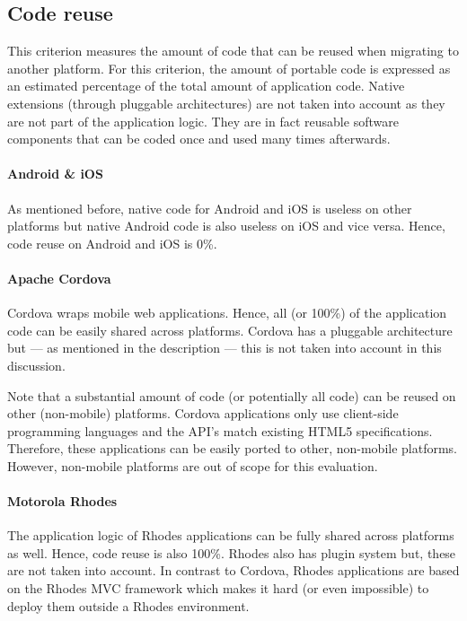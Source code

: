 \subsection{Code reuse}
\label{sec:cr}

This criterion measures the amount of code that can be reused when migrating to another platform. For this criterion, the amount of portable code is expressed as an estimated percentage of the total amount of application code. Native extensions (through pluggable architectures) are not taken into account as they are not part of the application logic. They are in fact reusable software components that can be coded once and used many times afterwards. 

\paragraph{Android \& iOS} As mentioned before, native code for Android and iOS is useless on other platforms but native Android code is also useless on iOS and vice versa. Hence, code reuse on Android and iOS is 0\%.

\paragraph{Apache Cordova} Cordova wraps mobile web applications. Hence, all (or 100\%) of the application code can be easily shared across platforms. Cordova has a pluggable architecture but --- as mentioned in the description --- this is not taken into account in this discussion.

Note that a substantial amount of code (or potentially all code) can be reused on other (non-mobile) platforms. Cordova applications only use client-side programming languages and the API's match existing HTML5 specifications. Therefore, these applications can be easily ported to other, non-mobile platforms. However, non-mobile platforms are out of scope for this evaluation.

\paragraph{Motorola Rhodes} The application logic of Rhodes applications can be fully shared across platforms as well. Hence, code reuse is also 100\%. Rhodes also has plugin system but, these are not taken into account. In contrast to Cordova, Rhodes applications are based on the Rhodes MVC framework which makes it hard (or even impossible) to deploy them outside a Rhodes environment.

